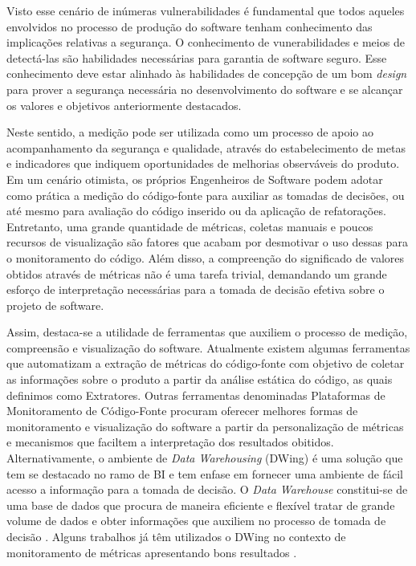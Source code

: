 Visto esse cenário de inúmeras vulnerabilidades é fundamental que todos aqueles envolvidos no processo de produção do software tenham conhecimento das implicações relativas a segurança.
%
O conhecimento de vunerabilidades e meios de detectá-las são habilidades necessárias para garantia de software seguro.
%
Esse conhecimento deve estar alinhado às habilidades de concepção de um bom \emph{design} para prover a segurança necessária no desenvolvimento do software e se alcançar os valores e objetivos anteriormente destacados.


Neste sentido, a medição pode ser utilizada como um processo de apoio ao acompanhamento da segurança e qualidade, através do estabelecimento de metas e indicadores que indiquem oportunidades de melhorias observáveis do produto.
%
Em um cenário otimista, os próprios Engenheiros de Software podem adotar como prática a medição do código-fonte para auxiliar as tomadas de decisões, ou até mesmo para avaliação do código inserido ou da aplicação de refatorações.
%
Entretanto, uma grande quantidade de métricas, coletas manuais e poucos recursos de visualização são fatores que acabam por desmotivar o uso dessas para o monitoramento do código.
%
Além disso, a compreenção do significado de valores obtidos através de métricas não é uma tarefa trivial, demandando um grande esforço de interpretação necessárias para a tomada de decisão efetiva sobre o projeto de software.


Assim, destaca-se a utilidade de ferramentas que auxiliem o processo de medição, compreensão e visualização do software.
%
Atualmente existem algumas ferramentas que automatizam a extração de métricas do código-fonte com objetivo de coletar as informações sobre o produto a partir da análise estática do código, as quais definimos como Extratores.
%
Outras ferramentas denominadas Plataformas de Monitoramento de Código-Fonte procuram oferecer melhores formas de monitoramento e visualização do software a partir da personalização de métricas e mecanismos que faciltem a interpretação dos resultados obitidos.
%
Alternativamente, o ambiente de \emph{Data Warehousing} (DWing) é uma solução que tem se destacado no ramo de BI e tem enfase em fornecer uma ambiente de fácil acesso a informação para a tomada de decisão. O \emph{Data Warehouse} constitui-se de uma base de dados que procura de maneira eficiente e flexível tratar de grande volume de dados e obter informações que auxiliem no processo de tomada de decisão \cite{lopes2007}. Alguns trabalhos já têm utilizados o DWing no contexto de monitoramento de métricas apresentando bons resultados  \cite{Castellanos2005} \cite{Folleco2007} \cite{Silveira2010}\cite{mazuco2011}.


